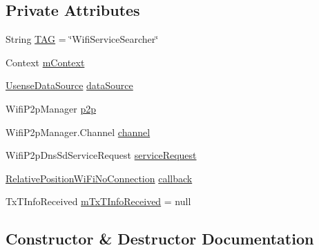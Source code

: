 \subsection*{Private Attributes}
\begin{DoxyCompactItemize}
\item 
String \hyperlink{classcs_1_1usense_1_1location_1_1_wifi_service_searcher_a651b6e7c10fad3df5abb64b926094e06}{T\+A\+G} = \char`\"{}Wifi\+Service\+Searcher\char`\"{}
\item 
Context \hyperlink{classcs_1_1usense_1_1location_1_1_wifi_service_searcher_a6d1f4bfac0c89d3e24f29b5cbd6dd0f2}{m\+Context}
\item 
\hyperlink{classcs_1_1usense_1_1db_1_1_usense_data_source}{Usense\+Data\+Source} \hyperlink{classcs_1_1usense_1_1location_1_1_wifi_service_searcher_aeee40bdaa21143fae75f3c02f4fef986}{data\+Source}
\item 
Wifi\+P2p\+Manager \hyperlink{classcs_1_1usense_1_1location_1_1_wifi_service_searcher_a8d17c39ea9de1933345bb634effab869}{p2p}
\item 
Wifi\+P2p\+Manager.\+Channel \hyperlink{classcs_1_1usense_1_1location_1_1_wifi_service_searcher_a3e0054b11568c3d6254492a63b5c5abd}{channel}
\item 
Wifi\+P2p\+Dns\+Sd\+Service\+Request \hyperlink{classcs_1_1usense_1_1location_1_1_wifi_service_searcher_aa16ad4453cab09ab5d45b8b7e4bd59ad}{service\+Request}
\item 
\hyperlink{classcs_1_1usense_1_1location_1_1_relative_position_wi_fi_no_connection}{Relative\+Position\+Wi\+Fi\+No\+Connection} \hyperlink{classcs_1_1usense_1_1location_1_1_wifi_service_searcher_ad71e138681812ba5928f041b84c2e39c}{callback}
\item 
Tx\+T\+Info\+Received \hyperlink{classcs_1_1usense_1_1location_1_1_wifi_service_searcher_ab640f7d28eadfc3075477a6f53673ff5}{m\+Tx\+T\+Info\+Received} = null
\end{DoxyCompactItemize}


\subsection{Constructor \& Destructor Documentation}
\hypertarget{classcs_1_1usense_1_1location_1_1_wifi_service_searcher_aadef7d33a18ab389882c68a6bccfd24c}{}
